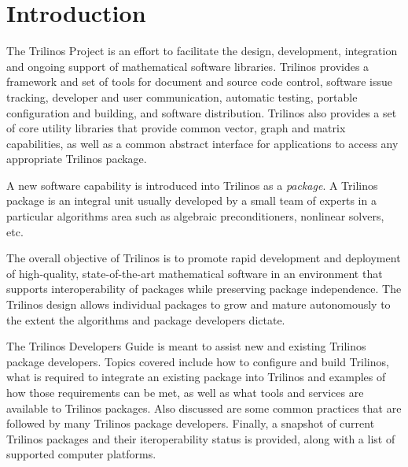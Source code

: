 \documentclass[12pt,relax]{TrilinosDevGuide}
\begin{document}
\section{Introduction}
\label{Section:Introduction}
The Trilinos Project is an effort to facilitate the design, development,
integration and ongoing support of mathematical software libraries.
Trilinos provides a framework and set of tools for document and source code control,
software issue tracking, developer and user communication, automatic
testing, portable configuration and building, and software
distribution.  Trilinos also provides a set of core utility libraries
that provide common vector, graph and matrix capabilities, as well as
a common abstract interface for applications to access any appropriate
Trilinos package.

A new software capability is introduced into Trilinos as a {\it
package}.  A Trilinos package is an integral unit usually developed by
a small team of experts in a particular algorithms area such as
algebraic preconditioners, nonlinear solvers, etc.

The overall objective of Trilinos is to promote rapid development and
deployment of high-quality, state-of-the-art mathematical software in
an environment that supports interoperability of packages while
preserving package independence.  The Trilinos design allows 
individual packages to grow and mature autonomously to the extent the 
algorithms and package developers dictate. 

The Trilinos Developers Guide is meant to assist new and existing
Trilinos package developers.  Topics covered include how to configure and 
build Trilinos, what is required to integrate an existing package into Trilinos
and examples of how those requirements can be met, as well as what
tools and services are 
available to Trilinos packages.  Also discussed are some common practices that 
are followed by many Trilinos package developers.  Finally, a snapshot
of current Trilinos packages and their iteroperability status
is provided, along with a list of supported computer platforms.
\end{document}

